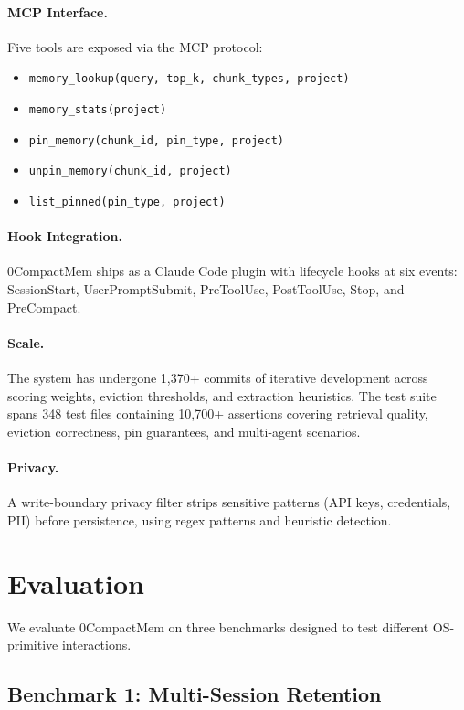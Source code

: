 \documentclass[10pt,twocolumn]{article}
\begin{document}
\paragraph{MCP Interface.} Five tools are exposed via the MCP protocol:
\begin{itemize}[leftmargin=*,nosep]
  \item \texttt{memory\_lookup(query, top\_k, chunk\_types, project)}
  \item \texttt{memory\_stats(project)}
  \item \texttt{pin\_memory(chunk\_id, pin\_type, project)}
  \item \texttt{unpin\_memory(chunk\_id, project)}
  \item \texttt{list\_pinned(pin\_type, project)}
\end{itemize}

\paragraph{Hook Integration.} 0CompactMem ships as a Claude Code plugin with lifecycle hooks at six events: SessionStart, UserPromptSubmit, PreToolUse, PostToolUse, Stop, and PreCompact.

\paragraph{Scale.} The system has undergone 1{,}370+ commits of iterative development across scoring weights, eviction thresholds, and extraction heuristics. The test suite spans 348 test files containing 10{,}700+ assertions covering retrieval quality, eviction correctness, pin guarantees, and multi-agent scenarios.

\paragraph{Privacy.} A write-boundary privacy filter strips sensitive patterns (API keys, credentials, PII) before persistence, using regex patterns and heuristic detection.

\section{Evaluation}
\label{sec:eval}

We evaluate 0CompactMem on three benchmarks designed to test different OS-primitive interactions.

\subsection{Benchmark 1: Multi-Session Retention}
\end{document}
